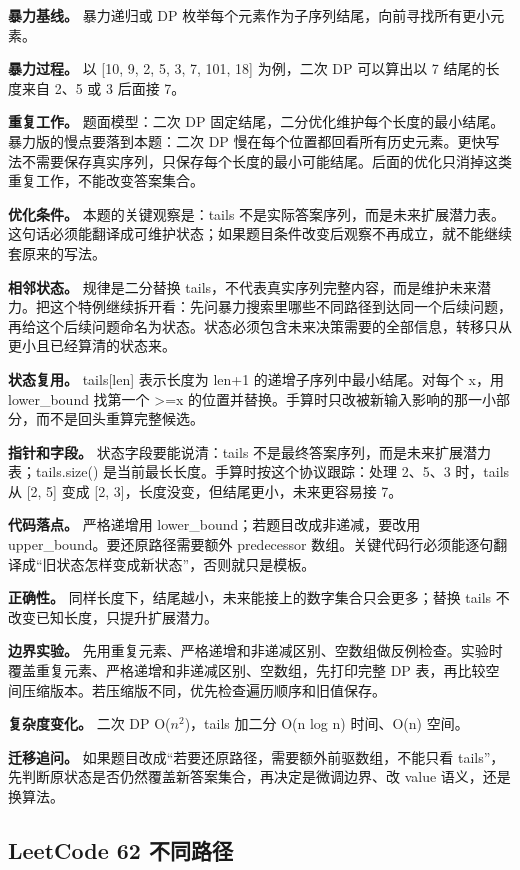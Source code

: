 \textbf{暴力基线。} 暴力递归或 DP 枚举每个元素作为子序列结尾，向前寻找所有更小元素。

\textbf{暴力过程。} 以 [10, 9, 2, 5, 3, 7, 101, 18] 为例，二次 DP 可以算出以 7 结尾的长度来自 2、5 或 3 后面接 7。

\textbf{重复工作。} 题面模型：二次 DP 固定结尾，二分优化维护每个长度的最小结尾。暴力版的慢点要落到本题：二次 DP 慢在每个位置都回看所有历史元素。更快写法不需要保存真实序列，只保存每个长度的最小可能结尾。后面的优化只消掉这类重复工作，不能改变答案集合。

\textbf{优化条件。} 本题的关键观察是：tails 不是实际答案序列，而是未来扩展潜力表。这句话必须能翻译成可维护状态；如果题目条件改变后观察不再成立，就不能继续套原来的写法。

\textbf{相邻状态。} 规律是二分替换 tails，不代表真实序列完整内容，而是维护未来潜力。把这个特例继续拆开看：先问暴力搜索里哪些不同路径到达同一个后续问题，再给这个后续问题命名为状态。状态必须包含未来决策需要的全部信息，转移只从更小且已经算清的状态来。

\textbf{状态复用。} tails[len] 表示长度为 len+1 的递增子序列中最小结尾。对每个 x，用 lower\_bound 找第一个 >=x 的位置并替换。手算时只改被新输入影响的那一小部分，而不是回头重算完整候选。

\textbf{指针和字段。} 状态字段要能说清：tails 不是最终答案序列，而是未来扩展潜力表；tails.size() 是当前最长长度。手算时按这个协议跟踪：处理 2、5、3 时，tails 从 [2, 5] 变成 [2, 3]，长度没变，但结尾更小，未来更容易接 7。

\textbf{代码落点。} 严格递增用 lower\_bound；若题目改成非递减，要改用 upper\_bound。要还原路径需要额外 predecessor 数组。关键代码行必须能逐句翻译成“旧状态怎样变成新状态”，否则就只是模板。

\textbf{正确性。} 同样长度下，结尾越小，未来能接上的数字集合只会更多；替换 tails 不改变已知长度，只提升扩展潜力。

\textbf{边界实验。} 先用重复元素、严格递增和非递减区别、空数组做反例检查。实验时覆盖重复元素、严格递增和非递减区别、空数组，先打印完整 DP 表，再比较空间压缩版本。若压缩版不同，优先检查遍历顺序和旧值保存。

\textbf{复杂度变化。} 二次 DP O(\ensuremath{n^{2}})，tails 加二分 O(n log n) 时间、O(n) 空间。

\textbf{迁移追问。} 如果题目改成“若要还原路径，需要额外前驱数组，不能只看 tails”，先判断原状态是否仍然覆盖新答案集合，再决定是微调边界、改 value 语义，还是换算法。

\subsection{LeetCode 62 不同路径}

